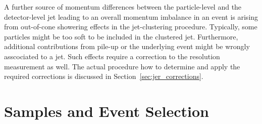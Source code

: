 A further source of momentum differences between the particle-level and the detector-level jet leading to an overall momentum imbalance in an event is arising from out-of-cone showering effects in the jet-clustering procedure. Typically, some particles might be too soft to be included in the clustered jet. Furthermore, additional contributions from pile-up or the underlying event might be wrongly asscociated to a jet. Such effects require a correction to the resolution measurement as well. The actual procedure how to determine and apply the required corrections is discussed in Section~\ref{sec:jer_corrections}.

\section{Samples and Event Selection}
\label{sec:jer_selection}

